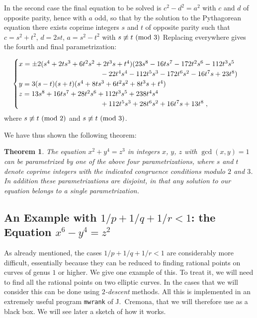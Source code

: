 \documentclass[12pt,a4paper]{article}
\newtheorem{theorem}{Theorem}[section]
\renewcommand{\pmod}[1]{\allowbreak\ ({\rm{mod}}\,\,#1)}
\begin{document}
\smallskip

In the second case the final equation to be solved is $c^2-d^2=a^2$ with $c$ 
and $d$ of opposite parity, hence with $a$ odd, so that by the solution to the
Pythagorean equation there exists coprime integers $s$ and $t$ of opposite 
parity such that $c=s^2+t^2$, $d=2st$, $a=s^2-t^2$ with $s\not\equiv t\pmod3$
Replacing everywhere gives the fourth and final parametrization:

$$\begin{cases}
x=\pm2(s^4+2ts^3+6t^2s^2+2t^3s+t^4)(23s^8-16ts^7-172t^2s^6-112t^3s^5&\\
\phantom{=\pm2(}\kern90pt-22t^4s^4-112t^5s^3-172t^6s^2-16t^7s+23t^8)&\\
y=3(s-t)(s+t)(s^4+8ts^3+6t^2s^2+8t^3s+t^4)&\\
z=13s^8+16ts^7+28t^2s^6+112t^3s^5+238t^4s^4&\\
\phantom{=\pm2(}\kern90pt+112t^5s^3+28t^6s^2+16t^7s+13t^8\;,&
\end{cases}$$
where $s\not\equiv t\pmod2$ and $s\not\equiv t\pmod3$.

We have thus shown the following theorem:

\begin{theorem} The equation $x^2+y^4=z^3$ in integers $x$, $y$, $z$ with
$\gcd(x,y)=1$ can be parametrized by one of the above four parametrizations,
where $s$ and $t$ denote coprime integers with the indicated congruence 
conditions modulo $2$ and $3$. In addition these parametrizations are disjoint,
in that any solution to our equation belongs to a single parametrization.
\end{theorem}


\subsection{An Example with $1/p+1/q+1/r<1$: the Equation $x^6-y^4=z^2$}

As already mentioned, the cases $1/p+1/q+1/r<1$ are considerably more
difficult, essentially because they can be reduced to finding rational points
on curves of genus $1$ or higher. We give one example of this. To treat it,
we will need to find all the rational points on two elliptic curves. In the
cases that we will consider this can be done using \emph{$2$-descent} methods.
All this is implemented in an extremely useful program {\tt mwrank} of
J.~Cremona, that we will therefore use as a black box. We will see later
a sketch of how it works.
\end{document}
